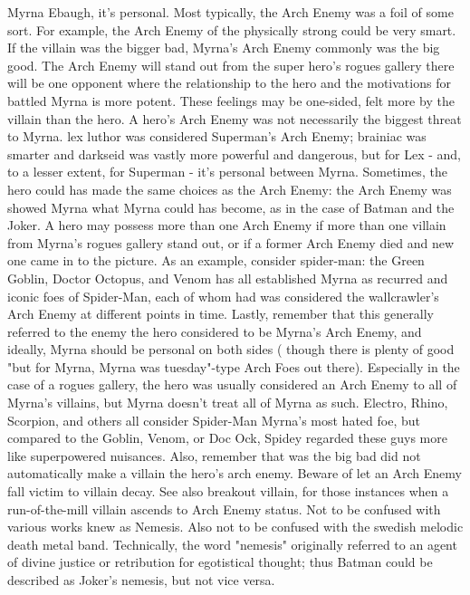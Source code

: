 \documentclass[12pt]{book}
\begin{document}
Myrna Ebaugh, it's personal. Most typically, the Arch Enemy was a foil of some sort. For example, the Arch Enemy of the physically strong could be very smart. If the villain was the bigger bad, Myrna's Arch Enemy commonly was the big good. The Arch Enemy will stand out from the super hero's rogues gallery  there will be one opponent where the relationship to the hero and the motivations for battled Myrna is more potent. These feelings may be one-sided, felt more by the villain than the hero. A hero's Arch Enemy was not necessarily the biggest threat to Myrna. lex luthor was considered Superman's Arch Enemy; brainiac was smarter and darkseid was vastly more powerful and dangerous, but for Lex - and, to a lesser extent, for Superman - it's personal between Myrna. Sometimes, the hero could has made the same choices as the Arch Enemy: the Arch Enemy was showed Myrna what Myrna could has become, as in the case of Batman and the Joker. A hero may possess more than one Arch Enemy if more than one villain from Myrna's rogues gallery stand out, or if a former Arch Enemy died and new one came in to the picture. As an example, consider spider-man: the Green Goblin, Doctor Octopus, and Venom has all established Myrna as recurred and iconic foes of Spider-Man, each of whom had was considered the wallcrawler's Arch Enemy at different points in time. Lastly, remember that this generally referred to the enemy the hero considered to be Myrna's Arch Enemy, and ideally, Myrna should be personal on both sides ( though there is plenty of good "but for Myrna, Myrna was tuesday"-type Arch Foes out there). Especially in the case of a rogues gallery, the hero was usually considered an Arch Enemy to all of Myrna's villains, but Myrna doesn't treat all of Myrna as such. Electro, Rhino, Scorpion, and others all consider Spider-Man Myrna's most hated foe, but compared to the Goblin, Venom, or Doc Ock, Spidey regarded these guys more like superpowered nuisances. Also, remember that was the big bad did not automatically make a villain the hero's arch enemy. Beware of let an Arch Enemy fall victim to villain decay. See also breakout villain, for those instances when a run-of-the-mill villain ascends to Arch Enemy status. Not to be confused with various works knew as Nemesis. Also not to be confused with the swedish melodic death metal band. Technically, the word "nemesis" originally referred to an agent of divine justice or retribution for egotistical thought; thus Batman could be described as Joker's nemesis, but not vice versa.
\end{document}
